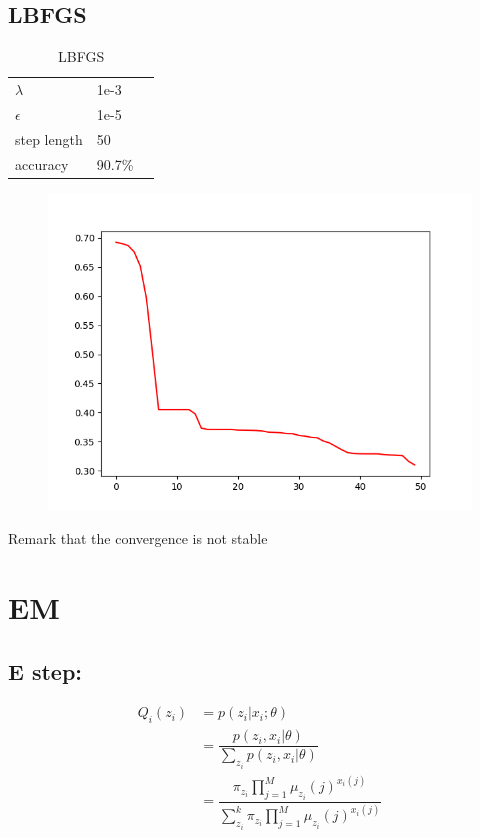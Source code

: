 \documentclass[a4paper,12pt]{article}
\begin{document}
\subsection{LBFGS}
\begin{table}[htbp]
    \caption{LBFGS}
    \label{LBFGS-table}
    \centering
    \begin{tabular}{lll}
      $\lambda$     &  1e-3 \\
      $\epsilon$     &  1e-5     \\
      step length     &   50 \\
      accuracy & 90.7\% 
    \end{tabular}
  \end{table}

\begin{figure}[htbp]
    \centering
    \includegraphics[width = .8\textwidth]{LBFGS}
    \caption{}
    \label{LBFGS}
\end{figure}

Remark that the convergence is not stable


\section{EM}
\subsection{E step:}
\begin{align}
Q_i(z_i) &= p(z_i \rvert x_i ; \theta)  \nonumber \\
& = \dfrac{p(z_i ,  x_i \rvert \theta)}{\sum_{z_i}p(z_i,  x_i \rvert \theta)} \nonumber \\
& = \dfrac{\pi_{z_i} \prod_{j = 1}^{M}\mu_{z_i}(j)^{x_i(j)}}{\sum_{z_i}^{k}\pi_{z_i} \prod_{j = 1}^{M} \mu_{z_i}(j)^{x_i(j)} }\nonumber 
\end{align}
\end{document}
